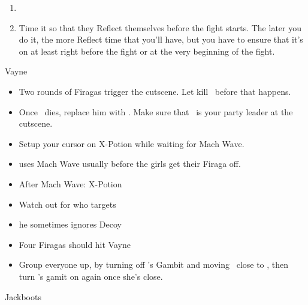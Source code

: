 \begin{enumerate}[resume]
	\item \GirlsGambitOn
	\item Time it so that they Reflect themselves before the fight starts. The later you do it, the more Reflect time that you'll have, but you have to ensure that it's on at least right before the fight or at the very beginning of the fight.
\end{enumerate}
\begin{battle}{Vayne}
	\begin{itemize}
		\vaanf Flee, keeping your distance from . Try to leave the girls next to Larsa so that Larsa gets killed.
		\item Two rounds of Firagas trigger the cutscene. Let  kill \balthier\ before that happens.
		\item Once \balthier\ dies, replace him with \vaan. Make sure that \vaan\ is your party leader at the cutscene.
		\item Setup your cursor on X-Potion while waiting for Mach Wave.
		\item {} uses Mach Wave usually before the girls get their Firaga off.
		\item After Mach Wave:
		      \vaanf X-Potion \vaan
		\item Watch out for who  targets \item  he sometimes ignores Decoy
		\item Four Firagas should hit Vayne
		\item Group everyone up, by turning off \penelo's Gambit and moving \vaan\ close to \ashe, then turn \penelo's gamit on again once she's close.
	\end{itemize}
	\begin{equip}
		\begin{itemize}\vaanf Jackboots\end{itemize}
	\end{equip}
	\begin{menu}
		\begin{itemize}\battlewait\end{itemize}
	\end{menu}

\end{battle}
